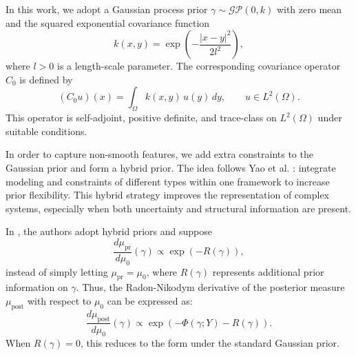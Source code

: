 \documentclass{ws-mplb}
\begin{document}
In this work, we adopt a Gaussian process prior $\gamma \sim \mathcal{GP}(0, k)$ with zero mean and the squared exponential covariance function
\[
k(x,y) = \exp\left(-\frac{|x-y|^2}{2l^2}\right),
\]
where $l>0$ is a length-scale parameter. The corresponding covariance operator $C_0$ is defined by
\[
(C_0 u)(x) = \int_{\Omega} k(x,y) \, u(y) \, dy, \qquad u \in L^2(\Omega).
\]
This operator is self-adjoint, positive definite, and trace-class on $L^2(\Omega)$ under suitable conditions.

%
%
%


In order to capture non-smooth features, we add extra constraints to the Gaussian prior and form a hybrid prior. The idea follows Yao et al. \cite{Yao2016}: integrate modeling and constraints of different types within one framework to increase prior flexibility. This hybrid strategy improves the representation of complex systems, especially when both uncertainty and structural information are present.


In \cite{Yao2016}, the authors adopt hybrid priors and suppose
\[
\frac{d\mu_{\text{pr}}}{d\mu_0}(\gamma) \propto \exp\left(-R(\gamma)\right),
\]
instead of simply letting \(\mu_{\text{pr}} = \mu_0\), where \(R(\gamma)\) represents additional prior information on \(\gamma\). Thus, the Radon-Nikodym derivative of the posterior measure \(\mu_{\text{post}}\) with respect to \(\mu_0\) can be expressed as:
\[
\frac{d\mu_{\text{post}}}{d\mu_0}(\gamma) \propto \exp\left(-\Phi(\gamma; Y) - R(\gamma)\right).
\]
When \(R(\gamma) = 0\), this reduces to the form under the standard Gaussian prior.
\end{document}
